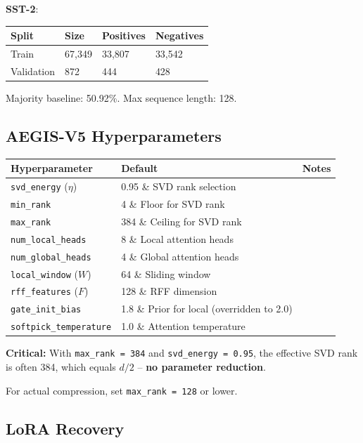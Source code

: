 \textbf{SST-2}:

\begin{table}[H]
\centering
\small
\begin{tabular}{llll}
\toprule
\textbf{Split} & \textbf{Size} & \textbf{Positives} & \textbf{Negatives} \\
\midrule
Train & 67,349 & 33,807 & 33,542 \\
Validation & 872 & 444 & 428 \\
\bottomrule
\end{tabular}
\end{table}

Majority baseline: 50.92\%. Max sequence length: 128.

\subsection{AEGIS-V5 Hyperparameters}

\begin{table}[H]
\centering
\small
\begin{tabular}{lll}
\toprule
\textbf{Hyperparameter} & \textbf{Default} & \textbf{Notes} \\
\midrule
\texttt{svd\_energy} ($\eta$) & 0.95 \& SVD rank selection \\
\texttt{min\_rank} & 4 \& Floor for SVD rank \\
\texttt{max\_rank} & 384 \& Ceiling for SVD rank \\
\texttt{num\_local\_heads} & 8 \& Local attention heads \\
\texttt{num\_global\_heads} & 4 \& Global attention heads \\
\texttt{local\_window} ($W$) & 64 \& Sliding window \\
\texttt{rff\_features} ($F$) & 128 \& RFF dimension \\
\texttt{gate\_init\_bias} & 1.8 \& Prior for local (overridden to 2.0) \\
\texttt{softpick\_temperature} & 1.0 \& Attention temperature \\
\bottomrule
\end{tabular}
\end{table}

\textbf{Critical:} With \texttt{max\_rank = 384} and \texttt{svd\_energy = 0.95}, the effective 
SVD rank is often 384, which equals $d/2$ -- \textbf{no parameter reduction}.

For actual compression, set \texttt{max\_rank = 128} or lower.

\subsection{LoRA Recovery}

